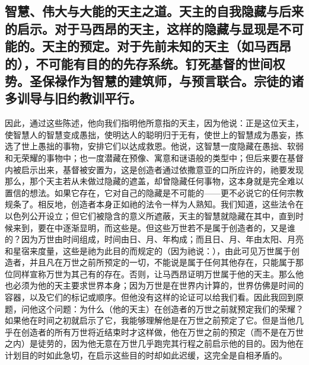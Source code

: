 
\subsection{智慧、伟大与大能的天主之道。天主的自我隐藏与后来的启示。对于马西昂的天主，这样的隐藏与显现是不可能的。天主的预定。对于先前未知的天主（如马西昂的），不可能有目的的先存系统。钉死基督的世间权势。圣保禄作为智慧的建筑师，与预言联合。宗徒的诸多训导与旧约教训平行。}

因此，通过这些陈述，他向我们指明他所意指的天主，因为他说：正是这位天主，使智慧人的智慧变成愚拙，使明达人的聪明归于无有，使世上的智慧成为愚妄，拣选了世上愚拙的事物，安排它们以达成救恩。他说，这智慧一度隐藏在愚拙、软弱和无荣耀的事物中；也一度潜藏在预像、寓意和谜语般的类型中；但后来要在基督内被启示出来，基督被安置为，这是创造者通过依撒意亚的口所应许的，祂要发现那么，那个天主若从未做过隐藏的遮盖，却曾隐藏任何事物，这本身就是完全难以置信的想法。如果它存在，它对自己的隐藏是不可能的——更不必说它的任何宗教规条了。相反地，创造者本身正如祂的法令一样为人熟知。我们知道，这些法令在以色列公开设立；但它们被隐含的意义所遮蔽，天主的智慧就隐藏在其中，直到时候来到，要在中逐渐显明，而这些是。但这些万世若不是属于创造者的，又是谁的？因为万世由时间组成，时间由日、月、年构成；而且日、月、年由太阳、月亮和星宿来度量，这些是祂为此目的而规定的（因为祂说：），由此可见万世属于创造者，并且凡在万世之前所预定的一切，不能说是属于任何其他存在，只能属于那位同样宣称万世为其己有的存在。否则，让马西昂证明万世属于他的天主。那么他也必须为他的天主要求世界本身；因为万世是在世界内计算的，世界仿佛是时间的容器，以及它们的标记或顺序。但他没有这样的论证可以给我们看。因此我回到原题，问他这个问题：为什么（他的天主）在创造者的万世之前就预定我们的荣耀？如果他在时间之初就启示了它，我能够理解他是在万世之前预定了它。但是当他几乎在创造者的所有万世将近结束时才这样做，他在万世之前的预定（而不是在万世之内）是徒劳的，因为他无意在万世几乎跑完其行程之前启示他的目的。因为他在计划目的时如此急切，在启示这些目的时却如此迟缓，这完全是自相矛盾的。\par

